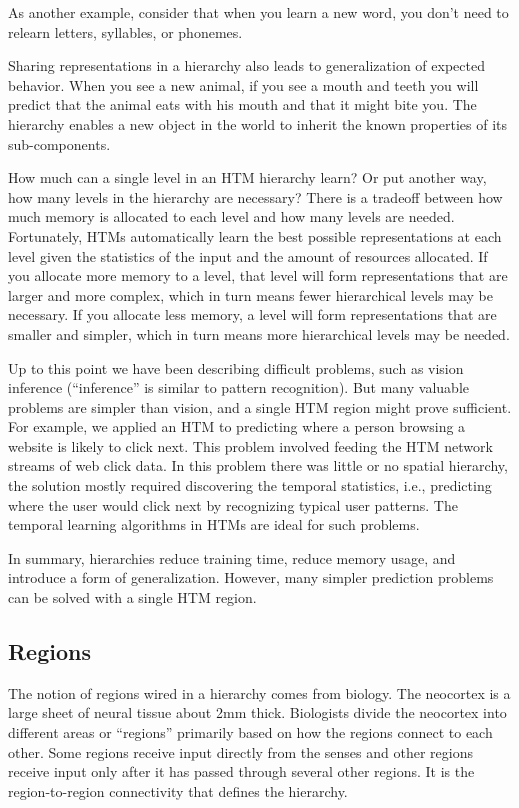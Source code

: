 \documentclass{report}
\begin{document}
As another example, consider that when you learn a new word, you don't
need to relearn letters, syllables, or phonemes.

Sharing representations in a hierarchy also leads to generalization of
expected behavior. When you see a new animal, if you see a mouth and
teeth you will predict that the animal eats with his mouth and that it
might bite you. The hierarchy enables a new object in the world to
inherit the known properties of its sub-components.

How much can a single level in an HTM hierarchy learn? Or put another
way, how many levels in the hierarchy are necessary? There is a
tradeoff between how much memory is allocated to each level and how
many levels are needed. Fortunately, HTMs automatically learn the best
possible representations at each level given the statistics of the
input and the amount of resources allocated. If you allocate more
memory to a level, that level will form representations that are
larger and more complex, which in turn means fewer hierarchical levels
may be necessary. If you allocate less memory, a level will form
representations that are smaller and simpler, which in turn means more
hierarchical levels may be needed.

Up to this point we have been describing difficult problems, such as
vision inference (``inference'' is similar to pattern
recognition). But many valuable problems are simpler than vision, and
a single HTM region might prove sufficient. For example, we applied an
HTM to predicting where a person browsing a website is likely to click
next. This problem involved feeding the HTM network streams of web
click data. In this problem there was little or no spatial hierarchy,
the solution mostly required discovering the temporal statistics,
i.e., predicting where the user would click next by recognizing typical
user patterns. The temporal learning algorithms in HTMs are ideal for
such problems.

In summary, hierarchies reduce training time, reduce memory usage, and
introduce a form of generalization. However, many simpler prediction
problems can be solved with a single HTM region.

\subsection*{Regions}

The notion of regions wired in a hierarchy comes from biology. The
neocortex is a large sheet of neural tissue about 2mm
thick. Biologists divide the neocortex into different areas or
``regions'' primarily based on how the regions connect to each
other. Some regions receive input directly from the senses and other
regions receive input only after it has passed through several other
regions. It is the region-to-region connectivity that defines the
hierarchy.
\end{document}

